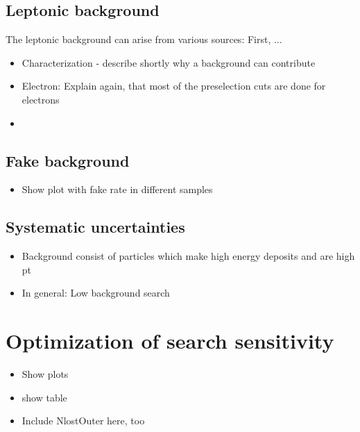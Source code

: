 \subsection{Leptonic background}
\label{sec:LeptonicBkg}

The leptonic background can arise from various sources: First, ...

\begin{itemize}
\item Characterization - describe shortly why a background can contribute
\item Electron: Explain again, that most of the preselection cuts are done for electrons
\item 
\end{itemize}


\subsection{Fake background}
\label{sec:FakeBkg}

\begin{itemize}
\item Show plot with fake rate in different samples
\end{itemize}

\subsection{Systematic uncertainties}
\label{sec:SysUncertaintiesBkg}


\begin{itemize}
\item Background consist of particles which make high energy deposits and are high pt
\item In general: Low background search
\end{itemize}


\newpage
\section{Optimization of search sensitivity}
\label{sec:Optimization}
\begin{itemize}
\item Show plots
\item show table
\item Include NlostOuter here, too
\end{itemize}

